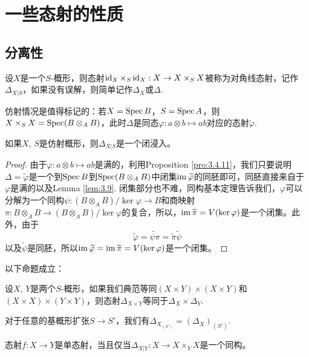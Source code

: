 
\chapter{一些态射的性质}

\section{分离性}

\begin{para}[对角线]
	设$X$是一个$S$-概形，则态射$\operatorname{id}_X\times_S\operatorname{id}_X:X\to X\times_S X$被称为对角线态射，记作$\Delta_{X|S}$，如果没有误解，则简单记作$\Delta_X$或$\Delta$.
\end{para}

仿射情况是值得标记的：若$X=\operatorname{Spec} B$，$S=\operatorname{Spec} A$，则$X\times_S X=\operatorname{Spec} (B\otimes_A B)$，此时$\Delta$是同态$\varphi:a\otimes b\mapsto ab$对应的态射$\widetilde{\varphi}$.

\begin{lem}\label{lem:4.1.2}
	如果$X$, $S$是仿射概形，则$\Delta_{X|S}$是一个闭浸入。
\end{lem}

\begin{proof}
由于$\varphi:a\otimes b\mapsto ab$是满的，利用Proposition \ref{pro:3.4.11}，我们只要说明$\Delta=\widetilde{\varphi}$是一个到$\operatorname{Spec} B$到$\operatorname{Spec} (B\otimes_A B)$中闭集$\operatorname{im} \widetilde{\varphi}$的同胚即可，同胚直接来自于$\varphi$是满的以及Lemma \ref{lem:3.9}. 闭集部分也不难，同构基本定理告诉我们，$\varphi$可以分解为一个同构$\psi:(B\otimes_A B)/\ker \varphi\to B$和商映射$\pi:B\otimes_A B\to (B\otimes_A B)/\ker \varphi$的复合，所以，$\operatorname{im} \widetilde{\pi}=V(\ker \varphi)$是一个闭集。此外，由于
\[
	\widetilde{\varphi}=\widetilde{\psi\pi}=\widetilde{\pi}\widetilde{\psi}
\]
以及$\widetilde{\psi}$是同胚，所以$\operatorname{im} \widetilde{\varphi}=\operatorname{im} \widetilde{\pi}=V(\ker \varphi)$是一个闭集。
\end{proof}

\begin{pro}
以下命题成立：
\begin{compactenum}
\item 设$X$, $Y$是两个$S$-概形，如果我们典范等同$(X\times Y)\times (X\times Y)$和$(X\times X)\times (Y\times Y)$，则态射$\Delta_{X\times Y}$等同于$\Delta_X\times \Delta_Y$.	
\item 对于任意的基概形扩张$S\to S'$，我们有$\Delta_{X_{(S')}}=(\Delta_{X})_{(S')}$.
\item 态射$f:X\to Y$是单态射，当且仅当$\Delta_{X|Y}:X\to X\times_Y X$是一个同构。
\end{compactenum}	
\end{pro}

